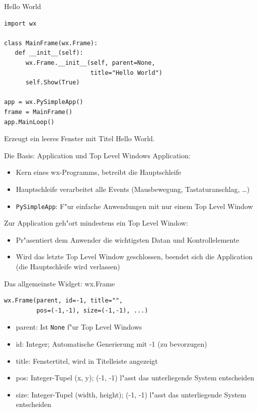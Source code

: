 \begin{frame}[fragile]{Hello World}
\begin{lstlisting}[style=Python]
import wx

class MainFrame(wx.Frame):
   def __init__(self):
      wx.Frame.__init__(self, parent=None, 
                        title="Hello World")
      self.Show(True)

app = wx.PySimpleApp()
frame = MainFrame()
app.MainLoop()
\end{lstlisting}
Erzeugt ein leeres Fenster mit Titel \glqq Hello World\grqq.
\end{frame}

\begin{frame}{Die Basis: Application und Top Level Windows}
\alert{Application:}
\begin{itemize}
\item Kern eines wx-Programms, betreibt die \alert{Hauptschleife}
\item Hauptschleife verarbeitet alle \alert{Events} (Mausbewegung, Tastaturanschlag, \dots)
\item \lstinline{PySimpleApp}: F"ur einfache Anwendungen mit nur einem Top Level Window
\end{itemize}
\vspace{3mm}
Zur Application geh"ort mindestens ein \alert{Top Level Window}:
\begin{itemize}
\item Pr"asentiert dem Anwender die wichtigsten Datan und Kontrollelemente
\item Wird das letzte Top Level Window geschlossen, beendet sich die Application (die Hauptschleife wird verlassen)
\end{itemize}
\end{frame}

\begin{frame}[fragile]{Das allgemeinste Widget: wx.Frame}
\begin{lstlisting}[style=Python]
wx.Frame(parent, id=-1, title="", 
         pos=(-1,-1), size=(-1,-1), ...)
\end{lstlisting}
\begin{itemize}
\item \alert{parent}: Ist \lstinline{None} f"ur Top Level Windows
\item \alert{id}: Integer; Automatische Generierung mit -1 (zu bevorzugen) 
\item \alert{title}: Fenstertitel, wird in Titelleiste angezeigt
\item \alert{pos}: Integer-Tupel (x, y); (-1, -1) l"asst das unterliegende System entscheiden
\item \alert{size}: Integer-Tupel (width, height); (-1, -1) l"asst das unterliegende System entscheiden
\end{itemize}
\end{frame}

